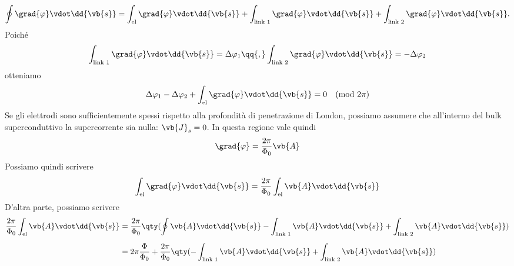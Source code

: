 \begin{equation*}
    \oint
    \grad{\varphi}\vdot\dd{\vb{s}}
    =
    \int_{\text{el}}
    \grad{\varphi}\vdot\dd{\vb{s}}
    +
    \int_{\text{link }1}
    \grad{\varphi}\vdot\dd{\vb{s}}
    +
    \int_{\text{link }2}
    \grad{\varphi}\vdot\dd{\vb{s}}.
\end{equation*}
Poiché
\begin{equation*}
    \int_{\text{link }1} \grad{\varphi}\vdot\dd{\vb{s}}
    =\Delta\varphi_1
    \qq{,}
    \int_{\text{link }2} \grad{\varphi}\vdot\dd{\vb{s}}
    =-\Delta\varphi_2
\end{equation*}
otteniamo
\begin{equation}
    \Delta\varphi_1
    - \Delta\varphi_2
    + \int_{\text{el}} \grad{\varphi}\vdot\dd{\vb{s}}
    =0
    \quad (\text{mod }2\pi)
    \label{eq:phase_difference_squid}
\end{equation}
Se gli elettrodi sono sufficientemente spessi rispetto alla profondità di penetrazione di London, possiamo assumere che all'interno del bulk superconduttivo la supercorrente sia nulla: $\vb{J}_s = 0$. In questa regione vale quindi
\begin{equation*}
    \grad{\varphi}=\frac{2\pi}{\Phi_0}\vb{A}
\end{equation*}
Possiamo quindi scrivere
\begin{equation*}
    \int_{\text{el}} \grad{\varphi}\vdot\dd{\vb{s}}
    =\frac{2\pi}{\Phi_0}\int_{\text{el}} \vb{A}\vdot\dd{\vb{s}}
\end{equation*}
D'altra parte, possiamo scrivere
\begin{equation*}
    \begin{split}
        \frac{2\pi}{\Phi_0}\int_{\text{el}} \vb{A}\vdot\dd{\vb{s}}
        & =
        \frac{2\pi}{\Phi_0} \qty( \oint \vb{A}\vdot\dd{\vb{s}}
        - \int_{\text{link }1} \vb{A}\vdot\dd{\vb{s}}
        + \int_{\text{link }2} \vb{A}\vdot\dd{\vb{s}} )
        \\[0.2cm]
        & =
        2\pi \frac{\Phi}{\Phi_0} 
        + \frac{2\pi}{\Phi_0} \qty(
        - \int_{\text{link }1} \vb{A}\vdot\dd{\vb{s}}
        + \int_{\text{link }2} \vb{A}\vdot\dd{\vb{s}} )
    \end{split}
\end{equation*}
